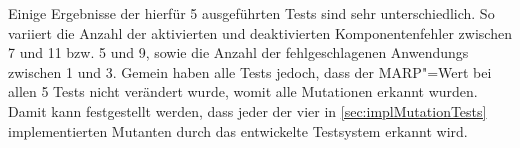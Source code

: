 Einige Ergebnisse der hierfür 5 ausgeführten \glspl{Test} sind sehr unterschiedlich.
So variiert die Anzahl der aktivierten und deaktivierten Komponentenfehler zwischen 7 und 11 bzw. 5 und 9, sowie die Anzahl der fehlgeschlagenen \glspl{Anwendung} zwischen 1 und 3.
Gemein haben alle \glspl{Test} jedoch, dass der \gls{MARP}"=Wert bei allen 5 \glspl{Test} nicht verändert wurde, womit alle Mutationen erkannt wurden.
Damit kann festgestellt werden, dass jeder der vier in \cref{sec:implMutationTests} implementierten Mutanten durch das entwickelte Testsystem erkannt wird.
